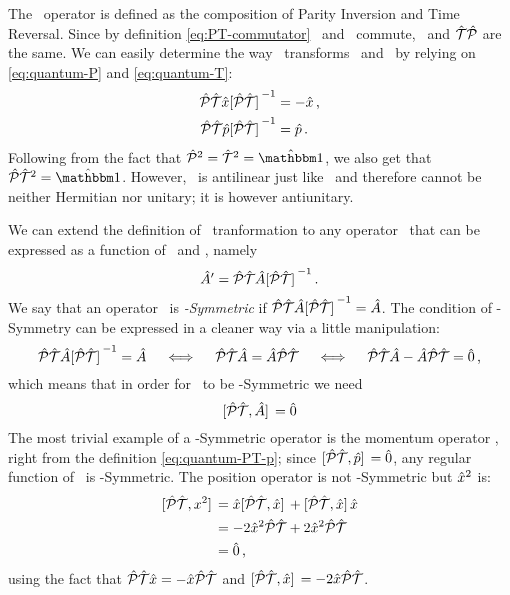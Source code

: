         The \hPT\ operator is defined as the composition of Parity Inversion and Time Reversal. Since by definition \eqref{eq:PT-commutator} \hP\ and \hT\ commute, \hPT\ and $\mathcal{\hat{T}}\mathcal{\hat{P}}$ are the same. We can easily determine the way \hPT\ transforms \hx\ and \hp\ by relying on \eqref{eq:quantum-P} and \eqref{eq:quantum-T}:
        \begin{align}
            \label{eq:quantum-PT-x}
            \PTtransform{\hx}
            &= -\hx
            \mycomma
            \\
            \label{eq:quantum-PT-p}
            \PTtransform{\hp}
            &= \hp
            \myperiod
        \end{align}
        Following from the fact that $\hP^2 = \hT^2 = \togglehat{\idM}$, we also get that $\hPT^2 = \togglehat{\idM}$. However, \hPT\ is antilinear just like \hT\ and therefore cannot be neither Hermitian nor unitary; it is however antiunitary.

        We can extend the definition of \PT\ tranformation to any operator \hA\ that can be expressed as a function of \hx\ and \hp, namely
        \begin{equation}
            \label{eq:pt-transform}
            \hA' = \PTtransform{\hA}
            \myperiod
        \end{equation}
        We say that an operator \hA\ is \emph{\PT-Symmetric} if $\PTtransform{\hA} = \hA$. The condition of \PT-Symmetry can be expressed in a cleaner way via a little manipulation:
        \begin{equation*}
            \PTtransform{\hA} = \hA
            \quad\iff\quad
            \hPT\hA = \hA\hPT
            \quad\iff\quad
            \hPT\hA - \hA\hPT = \hzero
            \mycomma
        \end{equation*}
        which means that in order for \hA\ to be \PT-Symmetric we need
        \begin{equation}
            \label{eq:pt-symmetric-operator}
            \comm*{\hPT}{\hA} = \hzero
        \end{equation}
        The most trivial example of a \PT-Symmetric operator is the momentum operator \hp, right from the definition \eqref{eq:quantum-PT-p}; since $\comm*{\hPT}{\hp} = \hzero$, any regular function of \hp\ is \PT-Symmetric. The position operator is not \PT-Symmetric but $\hat{x}^2$ is:
        \begin{align*}
            \comm*{\hPT}{x^2}
            &= \hx \comm*{\hPT}{\hx} + \comm*{\hPT}{\hx} \hx \\
            &= -2\hx^2\hPT + 2\hx^2\hPT \\
            &= \hzero 
            \mycomma
        \end{align*}
        using the fact that $\mathcal{\hat{P}}\mathcal{\hat{T}} \hat{x} = -\hat{x} \mathcal{\hat{P}}\mathcal{\hat{T}}$ and $\comm*{\hPT}{\hx} = -2\hx\hPT$.

